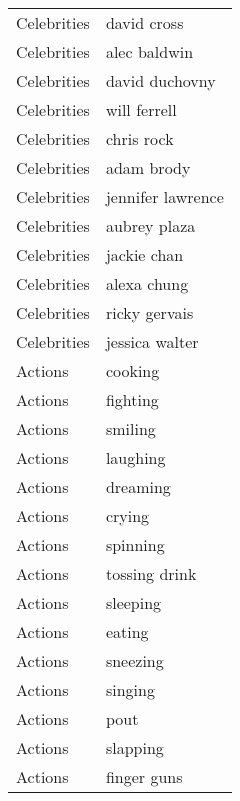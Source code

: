 \begin{supertabular}{l p{0.25\textwidth}}
      Celebrities &                        david cross \\
      Celebrities &                       alec baldwin \\
      Celebrities &                     david duchovny \\
      Celebrities &                       will ferrell \\
      Celebrities &                         chris rock \\
      Celebrities &                         adam brody \\
      Celebrities &                  jennifer lawrence \\
      Celebrities &                       aubrey plaza \\
      Celebrities &                        jackie chan \\
      Celebrities &                        alexa chung \\
      Celebrities &                      ricky gervais \\
      Celebrities &                     jessica walter \\
          Actions &                            cooking \\
          Actions &                           fighting \\
          Actions &                            smiling \\
          Actions &                           laughing \\
          Actions &                           dreaming \\
          Actions &                             crying \\
          Actions &                           spinning \\
          Actions &                      tossing drink \\
          Actions &                           sleeping \\
          Actions &                             eating \\
          Actions &                           sneezing \\
          Actions &                            singing \\
          Actions &                               pout \\
          Actions &                           slapping \\
          Actions &                        finger guns \\

\end{supertabular}
